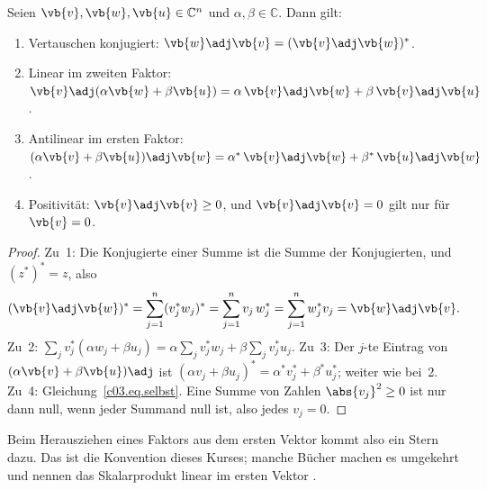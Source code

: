 \begin{proposition}\label{c03.prop.skalarprodukt}
  Seien $\vb{v}, \vb{w}, \vb{u} \in \mathbb{C}^n$ und $\alpha, \beta \in \mathbb{C}$. Dann gilt:
  \begin{enumerate}
    \item Vertauschen konjugiert: $\vb{w}\adj\vb{v} = (\vb{v}\adj\vb{w})^*$.
    \item Linear im zweiten Faktor:
      $\vb{v}\adj(\alpha\vb{w} + \beta\vb{u}) = \alpha\, \vb{v}\adj\vb{w} + \beta\, \vb{v}\adj\vb{u}$.
    \item Antilinear im ersten Faktor:
      $(\alpha\vb{v} + \beta\vb{u})\adj\vb{w} = \alpha^*\, \vb{v}\adj\vb{w} + \beta^*\, \vb{u}\adj\vb{w}$.
    \item Positivität: $\vb{v}\adj\vb{v} \geq 0$, und $\vb{v}\adj\vb{v} = 0$ gilt nur für
      $\vb{v} = 0$.
  \end{enumerate}
\end{proposition}
\begin{proof}
  Zu~1: Die Konjugierte einer Summe ist die Summe der Konjugierten, und $(z^*)^* = z$, also
  \begin{equation}\label{c03.eq.vertauschen}
    (\vb{v}\adj\vb{w})^* = \sum_{j=1}^{n} (v_j^* w_j)^* = \sum_{j=1}^{n} v_j\, w_j^*
    = \sum_{j=1}^{n} w_j^* v_j = \vb{w}\adj\vb{v} .
  \end{equation}
  Zu~2: $\sum_j v_j^* (\alpha w_j + \beta u_j) = \alpha \sum_j v_j^* w_j + \beta \sum_j v_j^* u_j$.
  Zu~3: Der $j$-te Eintrag von $(\alpha\vb{v} + \beta\vb{u})\adj$ ist
  $(\alpha v_j + \beta u_j)^* = \alpha^* v_j^* + \beta^* u_j^*$; weiter wie bei~2. Zu~4:
  Gleichung~\eqref{c03.eq.selbst}. Eine Summe von Zahlen $\abs{v_j}^2 \geq 0$ ist nur dann
  null, wenn jeder Summand null ist, also jedes $v_j = 0$.
\end{proof}

Beim Herausziehen eines Faktors aus dem ersten Vektor kommt also ein Stern dazu. Das ist die
Konvention dieses Kurses; manche Bücher machen es umgekehrt und nennen das Skalarprodukt
linear im ersten Vektor .

